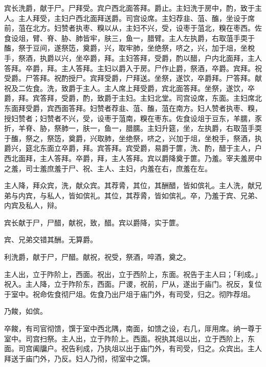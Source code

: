 \documentclass[]{article}
\begin{document}
宾长洗爵，献于尸。尸拜受。宾户西北面答拜。爵止。主妇洗于房中，酌，致于主人。主人拜受，主妇户西北面拜送爵。司宫设席。主妇荐韭、菹、醢，坐设于席前，菹在北方。妇赞者执枣、糗以从，主妇不兴，受，设枣于菹北，糗在枣西。佐食设俎，臂、脊、胁、肺皆牢，肤三，鱼一，腊臂。主人左执爵，右取菹手耎于醢，祭于豆间，遂祭笾，奠爵，兴，取牢肺，坐绝祭，哜之，兴，加于俎，坐梲手，祭酒，执爵以兴，坐卒爵，拜。主妇答拜，受爵，酌以醋，户内北面拜，主人答拜。卒爵，拜。主人答拜。主妇以爵入于房。尸作止爵，祭酒，卒爵。宾拜。祝受爵。尸答拜。祝酌授尸。宾拜受爵，尸拜送。坐祭，遂饮，卒爵拜。尸答拜。献祝及二佐食。洗，致爵于主人。主人席上拜受爵，宾北面答拜。坐祭，遂饮，卒爵，拜。宾答拜，受爵，酌，致爵于主妇。主妇北堂。司宫设席，东面。主妇席北东面拜受爵，宾西面答拜。妇赞者荐韭、菹、醢，菹在南方。妇人赞者执枣、糗，授妇赞者；妇赞者不兴，受，设枣于菹南，糗在枣东。佐食设俎于豆东，羊臑，豕折，羊脊、胁，祭肺一，肤一，鱼一，腊臑。主妇升筵，坐，左执爵，右取菹手耎于醢，祭之，祭笾，奠爵，兴取肺，坐绝祭，哜之，兴加于俎，坐梲手，祭酒，执爵兴，筵北东面立卒爵，拜。宾答拜。宾受爵，易爵于篚，洗、酌，醋于主人，户西北面拜，主人答拜。卒爵，拜，主人答拜。宾以爵降奠于篚。乃羞。宰夫羞房中之羞，司士羞庶羞于尸、祝、主人、主妇，内羞在右，庶羞在左。

主人降，拜众宾，洗，献众宾。其荐脀，其位，其酬醋，皆如傧礼。主人洗，献兄弟与内宾，与私人，皆如傧礼。其位，其荐脀，皆如傧礼。卒，乃羞于宾、兄弟、内宾及私人，辩。

宾长献于尸，尸醋，献祝，致，醋。宾以爵降，实于篚。

宾、兄弟交错其酬。无算爵。

利洗爵，献于尸，尸醋。献祝，祝受，祭酒，啐酒，奠之。

主人出，立于阼阶上，西面。祝出，立于西阶上，东面。祝告于主人曰；「利成。」祝入。主人降，立于阼阶东，西面。尸谡，祝前，尸从，遂出于庙门。祝反，复位于室中。祝命佐食彻尸俎。佐食乃出尸俎于庙门外，有司受，归之。彻阼荐俎。

乃餕，如傧。

卒餕，有司官彻馈，馔于室中西北隅，南面，如馈之设，右几，厞用席。纳一尊于室中。司宫扫祭。主人出，立于阼阶上。西面。祝执其俎以出，立于西阶上，东面。司宫阖牖户。祝告利成，乃执俎以出于庙门外，有司受，归之。众宾出。主人拜送于庙门外，乃反。妇人乃彻，彻室中之馔。
\end{document}
